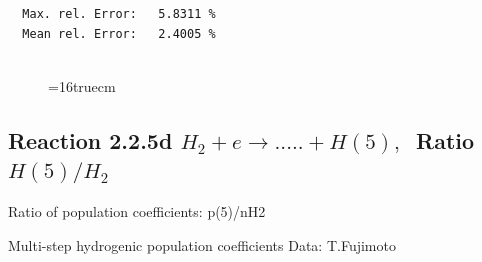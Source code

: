 \documentclass[12pt,dvips]{article}
\begin{document}
\begin{small}
\begin{verbatim}
  Max. rel. Error:   5.8311 %
  Mean rel. Error:   2.4005 %


\end{verbatim}\end{small}
\begin{figure} \label{2.2.5c}
\epsfxsize=16truecm
\end{figure}
\newpage
\subsection{
Reaction 2.2.5d  $H_2 + e \rightarrow .....+H(5)   , \  $
Ratio $H(5)/H_2 $
}

 Ratio of population coefficients: p(5)/nH2

 Multi-step hydrogenic population coefficients
 Data: T.Fujimoto
\end{document}
